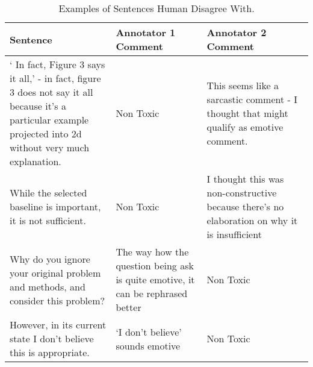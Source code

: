 \begin{table*}[t]
    \centering 
    \setlength{\tabcolsep}{4pt}
    \begin{tabular}{@{}p{0.35\linewidth}p{0.3\linewidth}p{0.35\linewidth} }
        \toprule
         \textbf{Sentence} & \textbf{Annotator 1 Comment} &\textbf{Annotator 2 Comment} \\
        \toprule
        ` In fact, Figure 3 says it all,' - in fact, figure 3 does not say it all because it's a particular example projected into 2d without very much explanation. & Non Toxic & This seems like a sarcastic comment - I thought that might qualify as emotive comment. \\
        \hline
        While the selected baseline is important, it is not sufficient. & Non Toxic & I thought this was non-constructive because there's no elaboration on why it is insufficient \\
        \hline
        Why do you ignore your original problem and methods, and consider this problem?  & The way how the question being ask is quite emotive, it can be rephrased better & Non Toxic \\
        \hline
        However, in its current state I don't believe this is appropriate. & `I don't believe' sounds emotive & Non Toxic \\
    \bottomrule
    \end{tabular}
    \caption{Examples of Sentences Human Disagree With.}
    \label{tab:disagreement_sentence}
\end{table*}
